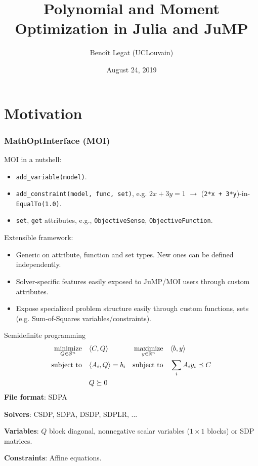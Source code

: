 \documentclass{beamer}
\title{Polynomial and Moment Optimization in Julia and JuMP}
\date{August 24, 2019}
\author{Beno\^it Legat (UCLouvain)}
\begin{document}
  \maketitle

  \begin{frame}
    \tableofcontents
  \end{frame}

\section{Motivation}

  \begin{frame}[fragile]
    \frametitle{MathOptInterface (MOI)}
    MOI in a nutshell:
    \begin{itemize}
      \item \verb|add_variable(model)|.
      \item \verb|add_constraint(model, func, set)|, e.g. $2x + 3y = 1$ $\to$ (\verb|2*x + 3*y|)-in-\verb|EqualTo(1.0)|.
      \item \verb|set|, \verb|get| attributes, e.g., \verb|ObjectiveSense|, \verb|ObjectiveFunction|.
    \end{itemize}
    Extensible framework:
    \begin{itemize}
      \item \alert{Generic} on attribute, function and set types. New ones can be defined \alert{independently}.
      \item Solver-\alert{specific} features easily exposed to JuMP/MOI users through \alert{custom} attributes.
      \item Expose \alert{specialized} problem structure easily through \alert{custom} functions, sets (e.g. Sum-of-Squares variables/constraints).
    \end{itemize}
  \end{frame}

  \begin{frame}{Semidefinite programming}
    \begin{align*}
      \operatorname*{minimize}_{Q \in \mathcal{S}^n} \quad & \langle C, Q \rangle & \operatorname*{maximize}_{y \in \mathbb{R}^n} \quad & \langle b, y \rangle\\
      \operatorname*{\operatorname*{\text{subject to}}\quad} & \langle A_i, Q \rangle = b_i & \operatorname*{\operatorname*{\text{subject to}}\quad} & \sum_i A_i y_i \preceq C\\
        & Q \succeq 0
    \end{align*}
    \textbf{File format}: SDPA

    \textbf{Solvers}: CSDP, SDPA, DSDP, SDPLR, ...

    \textbf{Variables}: $Q$ block diagonal, nonnegative scalar variables ($1 \times 1$ blocks) or SDP matrices.

    \textbf{Constraints}: Affine equations.
  \end{frame}
\end{document}
